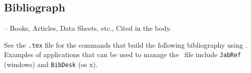 \subsection*{Bibliograph}
-- Books, Articles, Data Sheets, etc., Cited in the body. 

See the \verb|.tex| file for the commands that build the following bibliography using \BibTeX. Examples of applications that can be used to manage the \BibTeX\  file include \verb|JabRef| (windows) and \verb|BibDesk| (os x).
